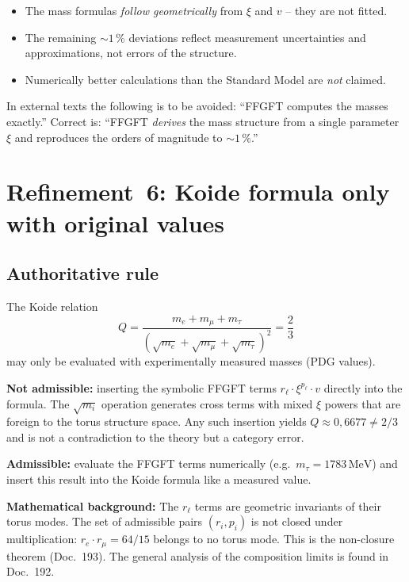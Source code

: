 \begin{itemize}
  \item The mass formulas \emph{follow geometrically} from $\xi$ and $v$ --
    they are not fitted.
  \item The remaining $\sim 1\,\%$ deviations reflect measurement
    uncertainties and approximations, not errors of the structure.
  \item Numerically better calculations than the Standard Model are
    \emph{not} claimed.
\end{itemize}

In external texts the following is to be avoided: ``FFGFT computes the masses
exactly.'' Correct is: ``FFGFT \emph{derives} the mass structure from a single
parameter $\xi$ and reproduces the orders of magnitude to $\sim 1\,\%$.''

\section{Refinement~6: Koide formula only with original values}

\subsection*{Authoritative rule}

The Koide relation
\begin{equation}
  Q = \frac{m_e + m_\mu + m_\tau}{(\sqrt{m_e}+\sqrt{m_\mu}+\sqrt{m_\tau})^2} = \frac{2}{3}
  \tag{190.11}
\end{equation}
may only be evaluated with experimentally measured masses (PDG values).

\textbf{Not admissible:} inserting the symbolic FFGFT terms
$r_\ell \cdot \xi^{p_\ell} \cdot v$ directly into the formula. The
$\sqrt{m_i}$ operation generates cross terms with mixed $\xi$ powers that are
foreign to the torus structure space. Any such insertion yields
$Q \approx 0{,}6677 \neq 2/3$ and is not a contradiction to the theory but a
category error.

\textbf{Admissible:} evaluate the FFGFT terms numerically (e.g.\
$m_\tau = 1783\,\text{MeV}$) and insert this result into the Koide formula like
a measured value.

\textbf{Mathematical background:} The $r_\ell$ terms are geometric invariants
of their torus modes. The set of admissible pairs $(r_i, p_i)$ is not closed
under multiplication: $r_e \cdot r_\mu = 64/15$ belongs to no torus mode. This
is the non-closure theorem (Doc.~193). The general analysis of the composition
limits is found in Doc.~192.

